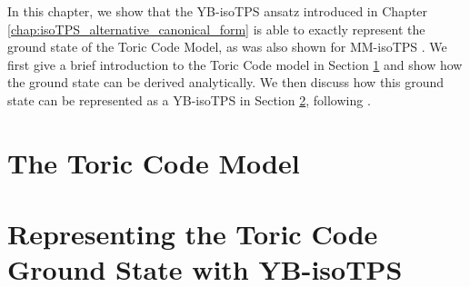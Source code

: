 In this chapter, we show that the YB-isoTPS ansatz introduced in Chapter \ref{chap:isoTPS_alternative_canonical_form} is able to exactly represent the ground state of the Toric Code Model, as was also shown for MM-isoTPS \cite{cite:isometric_tensor_network_representation_of_string_net_liquids}. We first give a brief introduction to the Toric Code model in Section \ref{sec:the_toric_code_model} and show how the ground state can be derived analytically. We then discuss how this ground state can be represented as a YB-isoTPS in Section \ref{sec:representing_the_toric_code_gs_with_YB_isoTPS}, following \cite{cite:isometric_tensor_network_representation_of_string_net_liquids}.

\section{The Toric Code Model}
\label{sec:the_toric_code_model}


\section{Representing the Toric Code Ground State with YB-isoTPS}
\label{sec:representing_the_toric_code_gs_with_YB_isoTPS}
